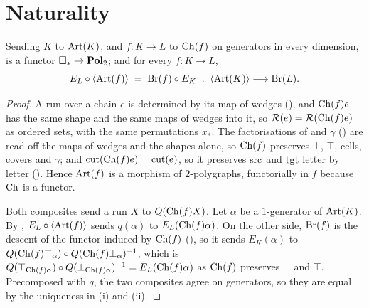 \documentclass[11pt]{article}
\begin{document}

\section{Naturality}\label{sec:thmB}

\begin{theorem}\label{thm:B}
  Sending $K$ to $\operatorname{Art}(K)$, and $f : K \to L$ to $\operatorname{Ch}(f)$ on generators in every dimension, is a functor
  $\square_{*} \to \mathbf{Pol}_2$; and for every $f : K \to L$,
  \[
    E_L \circ \left\langle \operatorname{Art}(f) \right\rangle \;=\; \operatorname{Br}(f) \circ E_K
    \;:\; \left\langle \operatorname{Art}(K) \right\rangle \longrightarrow \operatorname{Br}(L) .
  \]
\end{theorem}
\begin{proof}
  A run over a chain $e$ is determined by its map of wedges
  (), and $\operatorname{Ch}(f) e$ has the same shape and the same maps of wedges into it,
  so $\mathcal{R}(e) = \mathcal{R}(\operatorname{Ch}(f) e)$ as ordered sets, with the same permutations $x_*$.
  The factorisations of  and $\gamma$ () are read off
  the maps of wedges and the shapes alone, so $\operatorname{Ch}(f)$ preserves $\bot$, $\top$, cells, covers and
  $\gamma$; and $\operatorname{cut}(\operatorname{Ch}(f) e) = \operatorname{cut}(e)$, so it preserves $\operatorname{src}$ and $\operatorname{tgt}$ letter by letter
  (). Hence $\operatorname{Art}(f)$ is a morphism of $2$-polygraphs, functorially in
  $f$ because $\operatorname{Ch}$ is a functor.

  Both composites send a run $X$ to $Q(\operatorname{Ch}(f)X)$. Let $\alpha$ be a $1$-generator of $\operatorname{Art}(K)$.
  By , $E_L \circ \left\langle \operatorname{Art}(f) \right\rangle$ sends $q(\alpha)$ to
  $E_L(\operatorname{Ch}(f)\alpha)$. On the other side, $\operatorname{Br}(f)$ is the
  descent of the functor induced by $\operatorname{Ch}(f)$ (), so it sends $E_K(\alpha)$ to
  $Q(\operatorname{Ch}(f)\top_\alpha) \circ Q(\operatorname{Ch}(f)\bot_\alpha)^{-1}$, which is
  $Q(\top_{\operatorname{Ch}(f)\alpha}) \circ Q(\bot_{\operatorname{Ch}(f)\alpha})^{-1} = E_L(\operatorname{Ch}(f)\alpha)$ as $\operatorname{Ch}(f)$
  preserves $\bot$ and $\top$. Precomposed with $q$, the two composites agree on generators, so they
  are equal by the uniqueness in (i) and (ii).
\end{proof}

\end{document}
